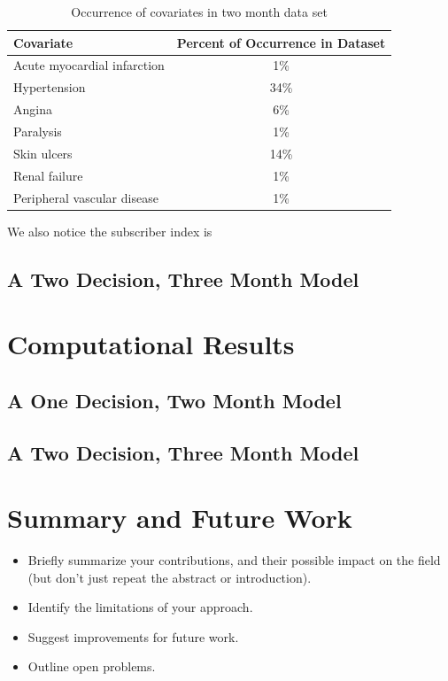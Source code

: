 \documentclass[10pt]{article}
\begin{document}
\begin{table}[H]
	\centering
	\begin{tabular}{l|c}
		\textbf{Covariate} &\textbf{Percent of Occurrence in Dataset} \\
		\hline
		Acute myocardial infarction & 1\% \\
		\hline
		Hypertension & 34\% \\
		\hline
		Angina & 6\% \\
		\hline
		Paralysis & 1\% \\
		\hline
		Skin ulcers & 14\% \\
		\hline
		Renal failure & 1\% \\
		\hline
		Peripheral vascular disease & 1\% \\
		\hline
	\end{tabular}
	\caption{Occurrence of covariates in two month data set}
	\label{rates}
\end{table}

We also notice the subscriber index is 

\subsection{A Two Decision, Three Month Model}




\section{Computational Results}

\subsection{A One Decision, Two Month Model}

\subsection{A Two Decision, Three Month Model}


\section{Summary and Future Work}
\begin{itemize}
\item Briefly summarize your contributions, and their possible
impact on the field (but don't just repeat the abstract or introduction).
\item Identify the limitations of your approach.
\item Suggest improvements for future work.
\item Outline open problems.
\end{itemize}
\end{document}
